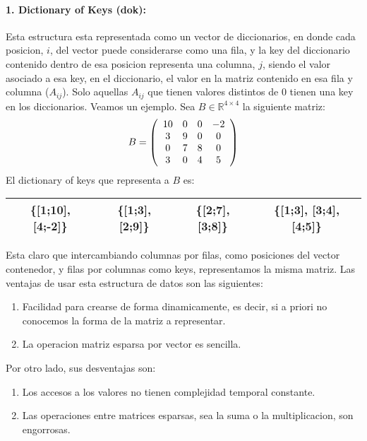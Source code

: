 \paragraph{1. Dictionary of Keys (dok):}
Esta estructura esta representada como un vector de diccionarios, en donde cada posicion, $i$, del vector puede considerarse como una fila, y la key del diccionario contenido dentro de esa posicion representa una columna, $j$, siendo el valor asociado a esa key, en el diccionario, el valor en la matriz contenido en esa fila y columna ($A_{ij}$). Solo aquellas $A_{ij}$ que tienen valores distintos de 0 tienen una key en los diccionarios.
\newline
\newline
Veamos un ejemplo. Sea $B \in \mathbb{R}^{4 \times 4}$ la siguiente matriz:
\[
  B = \left(\begin{array}{*5{c}}
    10 & 0 & 0 & -2\\
    3  & 9 & 0 & 0 \\
    0  & 7 & 8 & 0 \\
    3  & 0 & 4 & 5
  \end{array}\right)
\]
El dictionary of keys que representa a $B$ es:

\begin{table}[H]
	\centering
	\begin{tabular}{|c|c|c|c|}
		\hline
        \{[1;10], [4;-2]\} & \{[1;3], [2;9]\} & \{[2;7], [3;8]\} & \{[1;3], [3;4], [4;5]\} \\
        \hline
	\end{tabular}
\end{table}

Esta claro que intercambiando columnas por filas, como posiciones del vector contenedor, y filas por columnas como keys, representamos la misma matriz.
\newline
\newline
Las ventajas de usar esta estructura de datos son las siguientes:
\begin{enumerate}
  \item Facilidad para crearse de forma dinamicamente, es decir, si a priori no conocemos la forma de la matriz a representar.
  \item La operacion matriz esparsa por vector es sencilla.
\end{enumerate}
Por otro lado, sus desventajas son:
\begin{enumerate}
  \item Los accesos a los valores no tienen complejidad temporal constante.
  \item Las operaciones entre matrices esparsas, sea la suma o la multiplicacion, son engorrosas.
\end{enumerate}

